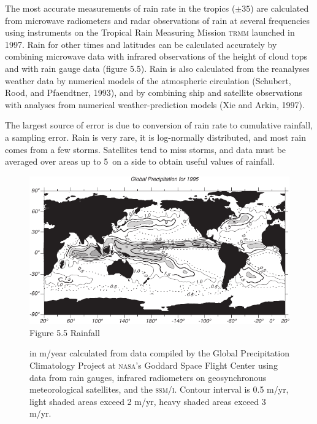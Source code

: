 The most accurate measurements of rain rate in the tropics
($\pm 35$\degrees) are calculated from microwave radiometers and radar
observations of rain at several frequencies using instruments on the
Tropical Rain Measuring Mission \textsc{trmm} launched in 1997. Rain
for other times and latitudes can be calculated accurately by
combining microwave data with infrared observations of the height of
cloud tops and with rain gauge data (figure 5.5). Rain is also
calculated from the reanalyses weather data by numerical models of the
atmospheric circulation (Schubert, Rood, and Pfaendtner, 1993), and by
combining ship and satellite observations with analyses from numerical
weather-prediction models (Xie and Arkin, 1997).

The largest source of error is due to conversion of rain rate to
cumulative rainfall, a sampling
error. Rain is very rare, it is log-normally
distributed, and most rain comes from a few storms. Satellites tend to
miss storms, and data must be averaged over areas up to 5\degrees\ on
a side to obtain useful values of rainfall.

\begin{figure}[t!]
\includegraphics{pics/precip} 
\footnotesize Figure 5.5 Rainfall
\rule{0pt}{3ex}in m/year calculated from data compiled by the Global Precipitation Climatology
Project at \textsc{nasa}'s Goddard Space Flight Center using data from
rain gauges, infrared radiometers on geosynchronous meteorological
satellites, and the \textsc{ssm/i}.  Contour interval is 0.5 m/yr,
light shaded areas exceed 2 m/yr, heavy shaded areas exceed 3
m/yr. \label{fig:precip}
\vspace{-4ex}
\end{figure}

